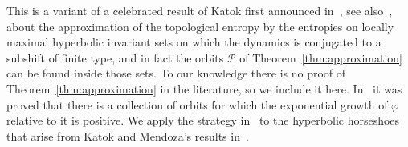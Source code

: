 \documentclass[10pt,a4paper]{amsart}
\numberwithin{equation}{section}
\newcommand{\clP}{\mathcal{P}}
\theoremstyle{definition}
\theoremstyle{remark}
\begin{document}
This is a variant of a celebrated result of Katok first announced in~\cite{Katok1984}, see also~\cite[Supplement]{Hasselblatt-Katok}, about the approximation of the topological entropy by the entropies on locally maximal hyperbolic invariant sets on which the dynamics is conjugated to a subshift of finite type, and in fact the orbits $\clP$ of Theorem~\ref{thm:approximation} can be found inside those sets. To our knowledge there is no proof of Theorem~\ref{thm:approximation} in the literature, so we include it here. In~\cite{FranksHandel1988} it was proved that there is a collection of orbits for which the exponential growth of $\varphi$ relative to it is positive. We apply the strategy in~\cite{FranksHandel1988} to the hyperbolic horseshoes that arise from Katok and Mendoza's results in~\cite[Supplement]{Hasselblatt-Katok}.
\end{document}
